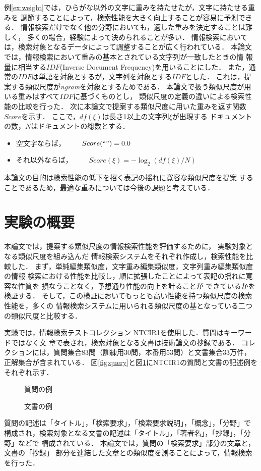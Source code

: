 例\ref{ex:weight}では，ひらがな以外の文字に重みを持たせたが，文字に持たせる重みを
調節することによって，検索性能を大きく向上することが容易に予測できる．
情報検索だけでなく他の分野においても，適した重みを決定することは難しく，
多くの場合，経験によって決められることが多い．
情報検索においては，検索対象となるデータによって調整することが広く行われている．
本論文では，情報検索において重みの基本とされている文字列が一致したときの情
報量に相当する$IDF$(Inverse Document Frequency)を用いることにした．
また，通常の$IDF$は単語を対象とするが，文字列を対象とする$IDF$とした．
これは，提案する類似尺度が{\it ngram}を対象とするためである．
本論文で扱う類似尺度が用いる重みはすべて$IDF$に基づくものとし，
類似尺度の定義の違いによる検索性能の比較を行った．
次に本論文で提案する類似尺度に用いた重みを返す関数$Score$を示す．
ここで，$df(\xi)$は長さ1以上の文字列$\xi$が出現する
ドキュメントの数，$N$はドキュメントの総数とする．
\begin{itemize}
\item 空文字ならば，~~~~
$ Score(``")=0.0 $
\item それ以外ならば，~~~~
$ Score(\xi)=-\log_2(df(\xi)/N) $
\end{itemize}
本論文の目的は検索性能の低下を招く表記の揺れに寛容な類似尺度を提案
することであるため，最適な重みについては今後の課題と考えている．

\section{実験の概要}

本論文では，提案する類似尺度の情報検索性能を評価するために，
実験対象となる類似尺度を組み込んだ
情報検索システムをそれぞれ作成し，検索性能を比較した．
まず，単純編集類似度，文字重み編集類似度，文字列重み編集類似度の情報
検索における性能を比較し，順に拡張したことによって表記の揺れに寛容な性質を
損なうことなく，予想通り性能の向上を計ることが
できているかを検証する．
そして，この検証においてもっとも高い性能を持つ類似尺度の検索性能を，多くの
情報検索システムに用いられる類似尺度の基となっている二つの類似尺度と比較する．

実験では，情報検索テストコレクション
NTCIR1\cite{Kando98,Kageura97}を使用した．質問はキーワードではなく文
章で表され，検索対象となる文書は技術論文の抄録である．
コレクションには，質問集合83問（訓練用30問，本番用53問）と文書集合33万件，
正解集合が含まれている．
図\ref{fig:query}と図\ref{fig:document}にNTCIR1の質問と文書の記述例を
それぞれ示す．
\begin{figure} [htbp]
\vspace*{-1em}
\begin{center}
\caption{質問の例}
\label{fig:query}
\vspace{0.5em}
\caption{文書の例}
\label{fig:document}
\end{center}
\end{figure}
質問の記述は「タイトル」，「検索要求」，「検索要求説明」，「概念」，「分野」で
構成され，検索対象となる文書の記述は「タイトル」，「著者名」，「抄録」，「分野」などで
構成されている．
本論文では，質問の「検索要求」部分の文章と，文書の「抄録」
部分を連結した文章との類似度を測ることによって，情報検索を行った．

